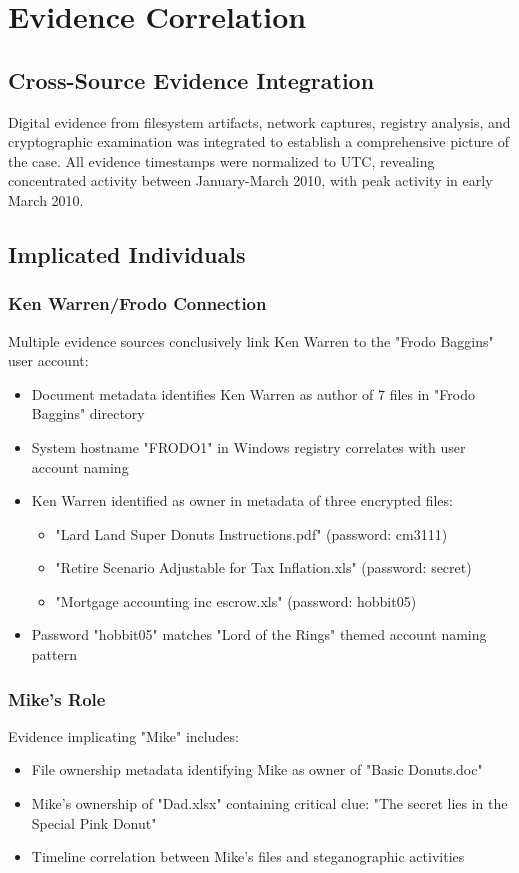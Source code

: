 \chapter{Evidence Correlation}

\section{Cross-Source Evidence Integration}
Digital evidence from filesystem artifacts, network captures, registry analysis, and cryptographic examination was integrated to establish a comprehensive picture of the case. All evidence timestamps were normalized to UTC, revealing concentrated activity between January-March 2010, with peak activity in early March 2010.

\section{Implicated Individuals} 
\subsection{Ken Warren/Frodo Connection}
Multiple evidence sources conclusively link Ken Warren to the "Frodo Baggins" user account:

\begin{itemize}
    \item Document metadata identifies Ken Warren as author of 7 files in "Frodo Baggins" directory
    \item System hostname "FRODO1" in Windows registry correlates with user account naming
    \item Ken Warren identified as owner in metadata of three encrypted files:
    \begin{itemize}
        \item "Lard Land Super Donuts Instructions.pdf" (password: cm3111)
        \item "Retire Scenario Adjustable for Tax Inflation.xls" (password: secret)
        \item "Mortgage accounting inc escrow.xls" (password: hobbit05)
    \end{itemize}
    \item Password "hobbit05" matches "Lord of the Rings" themed account naming pattern
\end{itemize}

\subsection{Mike's Role}
Evidence implicating "Mike" includes:
\begin{itemize}
    \item File ownership metadata identifying Mike as owner of "Basic Donuts.doc"
    \item Mike's ownership of "Dad.xlsx" containing critical clue: "The secret lies in the Special Pink Donut"
    \item Timeline correlation between Mike's files and steganographic activities
\end{itemize}

